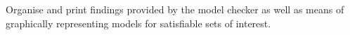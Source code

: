 \documentclass[a4paper, 11pt]{article} %
\begin{document}
Organise and print findings provided by the model checker as well as means of graphically representing models for satisfiable sets of interest.







%
\end{document}
